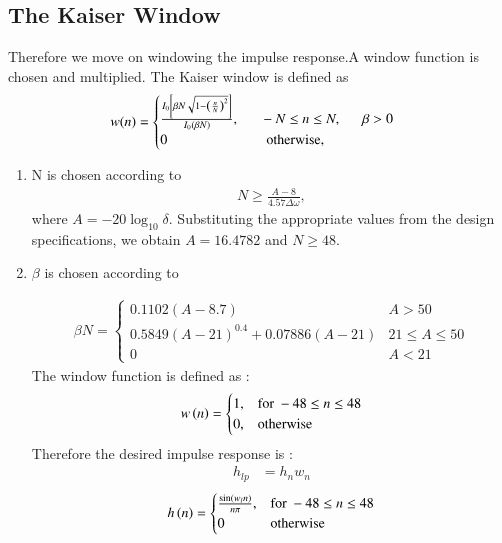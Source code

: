 \documentclass{article}
\begin{document}
\subsection{The Kaiser Window}
Therefore we move on windowing the impulse response.A window function is chosen and multiplied. The Kaiser window is defined as
\begin{align}
    w(n) =
    \begin{cases}
    \frac{I_0\left[ \beta N \sqrt{1 - \left(\frac{n}{N}\right)^2} \right]}{I_0(\beta N)},
\indent -N \leq n \leq N, \indent \beta > 0 \nonumber \\
 0 \hspace{2.5 cm} \mbox{otherwise,}
 \end{cases}
\end{align}

\begin{enumerate}
\item  N is chosen according to
\begin{align}
    N \geq \frac{A-8}{4.57\Delta \omega},
\end{align}
where $A = -20\log_{10}\delta$.  Substituting the appropriate values from the design specifications, we obtain
$A = 16.4782$ and $N \geq 48$.


\item  $\beta$ is chosen according to

\begin{align}
    \beta N = \left\{ \begin{array}{ll} 0.1102(A-8.7) & A > 50 \\
0.5849(A-21)^{0.4}+ 0.07886(A-21) & 21 \leq A \leq 50 \\
0 & A < 21\end{array} \right.
\end{align}
The window function is defined as :
\begin{align}
    w\left(n\right) = 
\begin{cases} 
    1, & \text{for } -48\leq n \leq 48 \\
    0, & \text{otherwise } 
\end{cases} \label{eq:w(n)_for_Kaiser}
\end{align}
Therefore the desired impulse response is :
\begin{align}
    h_{lp} &= h_{n}w_{n}
\end{align}
\begin{align}
    h\left(n\right) = 
\begin{cases} 
    \frac{\sin(w_l n)}{n\pi},  & \text{for } -48\leq n \leq 48 \\
    0 &\text{otherwise}
\end{cases} 
\end{align}
\end{enumerate}
\end{document}
